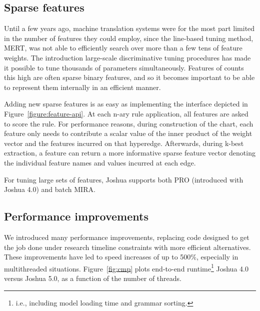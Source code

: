 \documentclass[11pt]{article}
\begin{document}
\subsection{Sparse features}

Until a few years ago, machine translation systems were for the most
part limited in the number of features they could employ, since the
line-based tuning method, MERT, was not able to efficiently search
over more than a few tens of feature weights. The introduction
large-scale discriminative tuning procedures has made it possible to
tune thousands of parameters simultaneously. Features of counts this
high are often sparse binary features, and so it becomes important to
be able to represent them internally in an efficient manner. 

Adding new sparse features is as easy as implementing the interface
depicted in Figure~\ref{figure:feature-api}. At each n-ary rule
application, all features are asked to score the rule. For performance
reasons, during construction of the chart, each feature only needs to
contribute a scalar value of the inner product of the weight vector
and the features incurred on that hyperedge. Afterwards, during k-best
extraction, a feature can return a more informative sparse feature
vector denoting the individual feature names and values incurred at
each edge.

For tuning large sets of features, Joshua supports both PRO
(introduced with Joshua 4.0) and batch MIRA.

\subsection{Performance improvements}

We introduced many performance improvements, replacing code designed
to get the job done under research timeline constraints with more
efficient alternatives. These improvements have led to speed increases
of up to 500\%, especially in multithreaded situations.
Figure~\ref{fig:cmp} plots end-to-end
runtime\footnote{i.e., including model loading time and grammar
  sorting.} Joshua 4.0 versus Joshua 5.0, as a function of the number
of threads.
\end{document}
